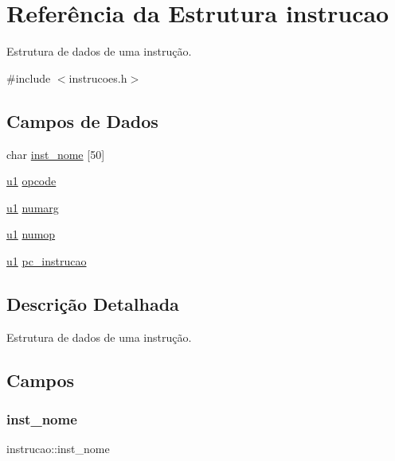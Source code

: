 \hypertarget{structinstrucao}{}\section{Referência da Estrutura instrucao}
\label{structinstrucao}


Estrutura de dados de uma instrução.  




{\ttfamily \#include $<$instrucoes.\+h$>$}

\subsection*{Campos de Dados}
\begin{DoxyCompactItemize}
\item 
char \hyperlink{structinstrucao_ac2c793a7850383fa1cb4cf040d3c3cb4}{inst\+\_\+nome} \mbox{[}50\mbox{]}
\item 
\hyperlink{lista__operandos_8h_ad9f4cdb6757615aae2fad89dab3c5470}{u1} \hyperlink{structinstrucao_a588fa0d2c21e3de3d31382cdd08a3f6c}{opcode}
\item 
\hyperlink{lista__operandos_8h_ad9f4cdb6757615aae2fad89dab3c5470}{u1} \hyperlink{structinstrucao_abe29e9abb3acf6ab4f1b4690d31b456d}{numarg}
\item 
\hyperlink{lista__operandos_8h_ad9f4cdb6757615aae2fad89dab3c5470}{u1} \hyperlink{structinstrucao_ada3363067b90142344358001d51dd197}{numop}
\item 
\hyperlink{lista__operandos_8h_ad9f4cdb6757615aae2fad89dab3c5470}{u1} \hyperlink{structinstrucao_adf700f8998ffadaabba2ebf5aa4f6e21}{pc\+\_\+instrucao}
\end{DoxyCompactItemize}


\subsection{Descrição Detalhada}
Estrutura de dados de uma instrução. 

\subsection{Campos}
\mbox{\label{structinstrucao_ac2c793a7850383fa1cb4cf040d3c3cb4}} 
\subsubsection{\texorpdfstring{inst\+\_\+nome}{inst\_nome}}
{\footnotesize\ttfamily instrucao\+::inst\+\_\+nome}

